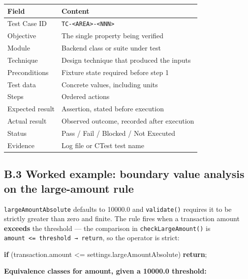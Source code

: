 \documentclass[
  12pt,
]{report}
\newenvironment{Shaded}{}{}
\newcommand{\ControlFlowTok}[1]{\textcolor[rgb]{0.00,0.44,0.13}{\textbf{#1}}}
\newcommand{\NormalTok}[1]{#1}
\newcommand{\OperatorTok}[1]{\textcolor[rgb]{0.40,0.40,0.40}{#1}}
\begin{document}
\begin{longtable}[]{@{}ll@{}}
\toprule\noalign{}
Field & Content \\
\midrule\noalign{}
\endhead
\bottomrule\noalign{}
\endlastfoot
Test Case ID &
\texttt{TC-\textless{}AREA\textgreater{}-\textless{}NNN\textgreater{}} \\
Objective & The single property being verified \\
Module & Backend class or suite under test \\
Technique & Design technique that produced the inputs \\
Preconditions & Fixture state required before step 1 \\
Test data & Concrete values, including units \\
Steps & Ordered actions \\
Expected result & Assertion, stated before execution \\
Actual result & Observed outcome, recorded after execution \\
Status & Pass / Fail / Blocked / Not Executed \\
Evidence & Log file or CTest test name \\
\end{longtable}

\subsection{B.3 Worked example: boundary value analysis on the
large-amount
rule}\label{b.3-worked-example-boundary-value-analysis-on-the-large-amount-rule}

\texttt{large\-Amount\-Absolute} defaults to 10000.0 and \texttt{validate()}
requires it to be strictly greater than zero and finite. The rule fires
when a transaction amount \textbf{exceeds} the threshold --- the
comparison in \texttt{check\-Large\-Amount()} is
\texttt{amount\ \textless{}=\ threshold\ →\ return}, so the operator is
strict:

\begin{Shaded}
\begin{Highlighting}[]
\ControlFlowTok{if} \OperatorTok{(}\NormalTok{transaction}\OperatorTok{.}\NormalTok{amount }\OperatorTok{\textless{}=}\NormalTok{ settings}\OperatorTok{.}\NormalTok{large\-Amount\-Absolute}\OperatorTok{)}
    \ControlFlowTok{return}\OperatorTok{;}
\end{Highlighting}
\end{Shaded}

\textbf{Equivalence classes for amount, given a 10000.0 threshold:}
\end{document}
